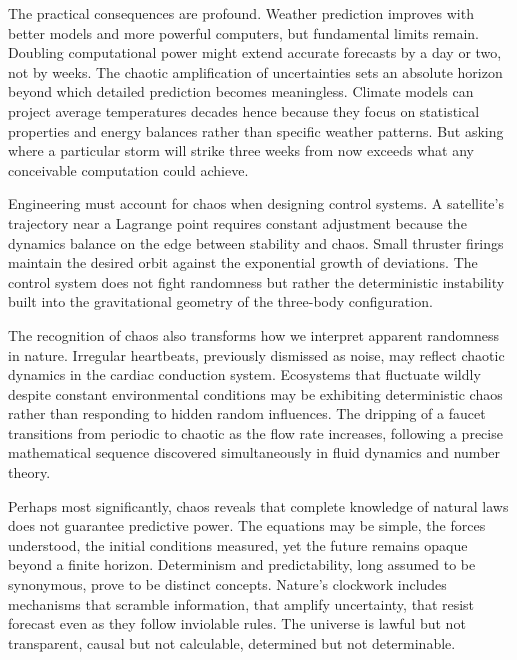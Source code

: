The practical consequences are profound. Weather prediction improves with better models and more powerful computers, but fundamental limits remain. Doubling computational power might extend accurate forecasts by a day or two, not by weeks. The chaotic amplification of uncertainties sets an absolute horizon beyond which detailed prediction becomes meaningless. Climate models can project average temperatures decades hence because they focus on statistical properties and energy balances rather than specific weather patterns. But asking where a particular storm will strike three weeks from now exceeds what any conceivable computation could achieve.

Engineering must account for chaos when designing control systems. A satellite's trajectory near a Lagrange point requires constant adjustment because the dynamics balance on the edge between stability and chaos. Small thruster firings maintain the desired orbit against the exponential growth of deviations. The control system does not fight randomness but rather the deterministic instability built into the gravitational geometry of the three-body configuration.

The recognition of chaos also transforms how we interpret apparent randomness in nature. Irregular heartbeats, previously dismissed as noise, may reflect chaotic dynamics in the cardiac conduction system. Ecosystems that fluctuate wildly despite constant environmental conditions may be exhibiting deterministic chaos rather than responding to hidden random influences. The dripping of a faucet transitions from periodic to chaotic as the flow rate increases, following a precise mathematical sequence discovered simultaneously in fluid dynamics and number theory.

Perhaps most significantly, chaos reveals that complete knowledge of natural laws does not guarantee predictive power. The equations may be simple, the forces understood, the initial conditions measured, yet the future remains opaque beyond a finite horizon. Determinism and predictability, long assumed to be synonymous, prove to be distinct concepts. Nature's clockwork includes mechanisms that scramble information, that amplify uncertainty, that resist forecast even as they follow inviolable rules. The universe is lawful but not transparent, causal but not calculable, determined but not determinable.
